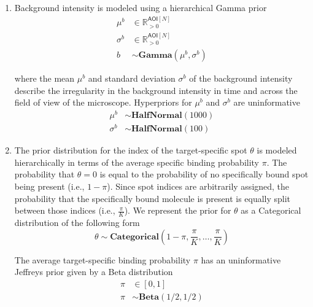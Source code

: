 \begin{enumerate}
    \item Background intensity is modeled using a hierarchical Gamma prior
%
\begin{subequations}
\begin{align}
    \mu^b &\in \mathbb{R}_{>0}^{\mathsf{AOI}[N]} \\
    \sigma^b &\in \mathbb{R}_{>0}^{\mathsf{AOI}[N]} \\
    b &\sim \mathbf{Gamma}(\mu^b, \sigma^b)
\end{align}
\end{subequations}

\noindent
where the mean $\mu^b$ and standard deviation $\sigma^b$ of the background intensity describe the irregularity in the background intensity in time and across the field of view of the microscope. Hyperpriors for $\mu^b$ and $\sigma^b$ are uninformative
%
\begin{subequations}
\begin{align}
    \mu^b &\sim \mathbf{HalfNormal}(1000) \\
    \sigma^b &\sim \mathbf{HalfNormal}(100)
\end{align}
\end{subequations}

\item The prior distribution for the index of the target-specific spot $\theta$ is modeled hierarchically in terms of the average specific binding probability $\pi$. The probability that $\theta = 0$ is equal to the probability of no specifically bound spot being present (i.e., $1-\pi$). Since spot indices are arbitrarily assigned, the probability that the specifically bound molecule is present is equally split between those indices (i.e., $\frac{\pi}{K}$). We represent the prior for $\theta$ as a Categorical distribution of the following form
%
\begin{equation}
    \theta \sim \mathbf{Categorical}\left(1 - \pi, \frac{\pi}{K}, \dots, \frac{\pi}{K}\right)
\end{equation}

\noindent
The average target-specific binding probability $\pi$ has an uninformative Jeffreys prior given by a Beta distribution
%
\begin{subequations}
\begin{align}
    \pi &\in [0, 1] \\
    \pi &\sim \mathbf{Beta}(1/2, 1/2)
\end{align}
\end{subequations}


\end{enumerate}
